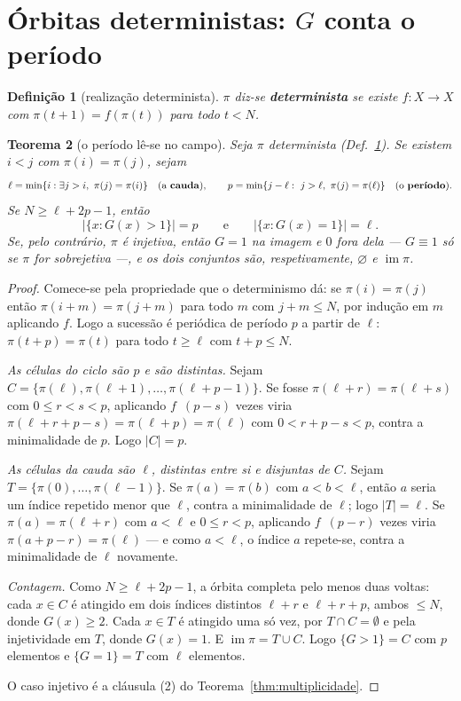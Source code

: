 \documentclass[11pt,a4paper]{article}
\newtheorem{teorema}{Teorema}
\newtheorem{definicao}[teorema]{Definição}
\begin{document}
\section{Órbitas deterministas: $G$ conta o período}\label{sec:periodo}

\begin{definicao}[realização determinista]\label{def:determinista}
$\pi$ diz-se \textbf{determinista} se existe $f\colon X\to X$ com
$\pi(t+1)=f(\pi(t))$ para todo $t<N$.
\end{definicao}

\begin{teorema}[o período lê-se no campo]\label{thm:periodo}
Seja $\pi$ determinista (Def.~\ref{def:determinista}). Se existem $i<j$ com
$\pi(i)=\pi(j)$, sejam
\[
\ell=\min\{i:\exists j>i,\ \pi(j)=\pi(i)\}\quad(\text{a \textbf{cauda}}),\qquad
p=\min\{j-\ell:\ j>\ell,\ \pi(j)=\pi(\ell)\}\quad(\text{o \textbf{período}}).
\]
Se $N\ge\ell+2p-1$, então
\[
\bigl\lvert\{x: G(x)>1\}\bigr\rvert=p
\qquad\text{e}\qquad
\bigl\lvert\{x: G(x)=1\}\bigr\rvert=\ell .
\]
Se, pelo contrário, $\pi$ é injetiva, então $G=1$ na imagem e $0$ fora dela ---
$G\equiv1$ só se $\pi$ for sobrejetiva ---, e os dois conjuntos são,
respetivamente, $\varnothing$ e $\operatorname{im}\pi$.
\end{teorema}

\begin{proof}
Comece-se pela propriedade que o determinismo dá: se $\pi(i)=\pi(j)$ então
$\pi(i+m)=\pi(j+m)$ para todo $m$ com $j+m\le N$, por indução em $m$ aplicando
$f$. Logo a sucessão é periódica de período $p$ a partir de $\ell$:
$\pi(t+p)=\pi(t)$ para todo $t\ge\ell$ com $t+p\le N$.

\emph{As células do ciclo são $p$ e são distintas.} Sejam
$C=\{\pi(\ell),\pi(\ell+1),\dots,\pi(\ell+p-1)\}$. Se fosse
$\pi(\ell+r)=\pi(\ell+s)$ com $0\le r<s<p$, aplicando $f$ $\,(p-s)$ vezes viria
$\pi(\ell+r+p-s)=\pi(\ell+p)=\pi(\ell)$ com $0<r+p-s<p$, contra a minimalidade de
$p$. Logo $\lvert C\rvert=p$.

\emph{As células da cauda são $\ell$, distintas entre si e disjuntas de $C$.}
Sejam $T=\{\pi(0),\dots,\pi(\ell-1)\}$. Se $\pi(a)=\pi(b)$ com $a<b<\ell$, então
$a$ seria um índice repetido menor que $\ell$, contra a minimalidade de $\ell$;
logo $\lvert T\rvert=\ell$. Se $\pi(a)=\pi(\ell+r)$ com $a<\ell$ e $0\le r<p$,
aplicando $f$ $\,(p-r)$ vezes viria $\pi(a+p-r)=\pi(\ell)$ --- e como
$a<\ell$, o índice $a$ repete-se, contra a minimalidade de $\ell$ novamente.

\emph{Contagem.} Como $N\ge\ell+2p-1$, a órbita completa pelo menos duas voltas:
cada $x\in C$ é atingido em dois índices distintos $\ell+r$ e $\ell+r+p$, ambos
$\le N$, donde $G(x)\ge2$. Cada $x\in T$ é atingido uma só vez, por
$T\cap C=\emptyset$ e pela injetividade em $T$, donde $G(x)=1$. E
$\operatorname{im}\pi=T\cup C$. Logo $\{G>1\}=C$ com $p$ elementos e $\{G=1\}=T$
com $\ell$ elementos.

O caso injetivo é a cláusula (2) do Teorema~\ref{thm:multiplicidade}.
\end{proof}
\end{document}
